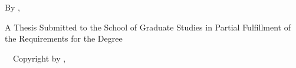 \null %
\vspace{0.2\textheight}

\begin{center}
  \MakeUppercase{\thesisTitle}

  \vspace{2cm}

  By \MakeUppercase{\thesisAuthorName}, \thesisAuthorCredentials{}

  \vfill

  A Thesis Submitted to the School of Graduate Studies in Partial Fulfillment of
  the Requirements for the Degree \thesisTargetDegree{}

  \vspace{2cm}

  \thesisInstitution\ \textcopyright\ Copyright by \thesisAuthorName{}, \thesisSubmissionMonthYear{}

\end{center}
